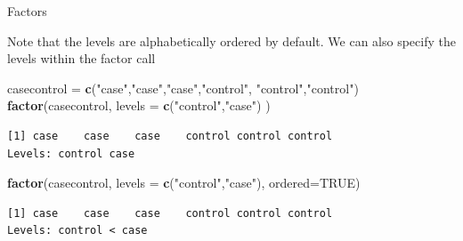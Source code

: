 \documentclass[
  ignorenonframetext,
]{beamer}
\newenvironment{Shaded}{\begin{snugshade}}{\end{snugshade}}
\newcommand{\DataTypeTok}[1]{\textcolor[rgb]{0.13,0.29,0.53}{#1}}
\newcommand{\KeywordTok}[1]{\textcolor[rgb]{0.13,0.29,0.53}{\textbf{#1}}}
\newcommand{\NormalTok}[1]{#1}
\newcommand{\OtherTok}[1]{\textcolor[rgb]{0.56,0.35,0.01}{#1}}
\newcommand{\StringTok}[1]{\textcolor[rgb]{0.31,0.60,0.02}{#1}}
\begin{document}
\begin{frame}[fragile]{Factors}
\protect\hypertarget{factors-3}{}

Note that the levels are alphabetically ordered by default. We can also
specify the levels within the factor call

\begin{Shaded}
\begin{Highlighting}[]
\NormalTok{casecontrol =}\StringTok{ }\KeywordTok{c}\NormalTok{(}\StringTok{"case"}\NormalTok{,}\StringTok{"case"}\NormalTok{,}\StringTok{"case"}\NormalTok{,}\StringTok{"control"}\NormalTok{,}
          \StringTok{"control"}\NormalTok{,}\StringTok{"control"}\NormalTok{)}
\KeywordTok{factor}\NormalTok{(casecontrol, }\DataTypeTok{levels =} \KeywordTok{c}\NormalTok{(}\StringTok{"control"}\NormalTok{,}\StringTok{"case"}\NormalTok{) )}
\end{Highlighting}
\end{Shaded}

\begin{verbatim}
[1] case    case    case    control control control
Levels: control case
\end{verbatim}

\begin{Shaded}
\begin{Highlighting}[]
\KeywordTok{factor}\NormalTok{(casecontrol, }\DataTypeTok{levels =} \KeywordTok{c}\NormalTok{(}\StringTok{"control"}\NormalTok{,}\StringTok{"case"}\NormalTok{), }
       \DataTypeTok{ordered=}\OtherTok{TRUE}\NormalTok{)}
\end{Highlighting}
\end{Shaded}

\begin{verbatim}
[1] case    case    case    control control control
Levels: control < case
\end{verbatim}

\end{frame}
\end{document}
